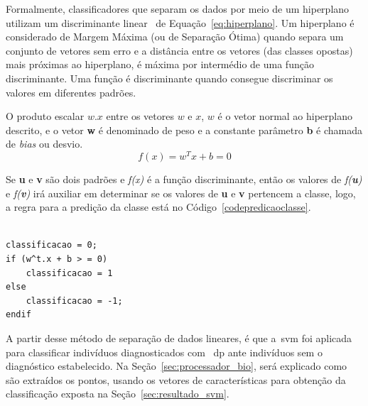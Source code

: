 Formalmente, classificadores que separam os dados por meio de um hiperplano utilizam um discriminante linear~\cite{valt2010} de Equação~\ref{eq:hiperplano}. Um hiperplano é considerado de Margem Máxima (ou de Separação Ótima) quando separa um conjunto de vetores sem erro e a distância entre os vetores (das classes opostas) mais próximas ao hiperplano, é máxima por intermédio de uma função discriminante. Uma função é discriminante quando consegue discriminar os valores em diferentes padrões. 

O produto escalar $ w.x $ entre os vetores $ w $ e $ x $, $ w $ é o vetor normal ao hiperplano descrito, e o vetor \textbf{w} é denominado de peso e a constante parâmetro \textbf{b} é chamada de \textit{bias} ou desvio.
\linebreak
\begin{equation}
f(x)=w^Tx+b=0
\label{eq:hiperplano}
\end{equation}

Se \textbf{u} e \textbf{v} são dois padrões e \textit{f(x)} é a função discriminante, então os valores de \textit{f(\textbf{u})} e \textit{f(\textbf{v})} irá auxiliar em determinar se os valores de \textbf{u} e \textbf{v} pertencem a classe, logo, a regra para a predição da classe está no Código~\ref{codepredicaoclasse}. 

\begin{lstlisting}[frame=single, caption=Código de Predição da Classes, label=codepredicaoclasse]  % Start your code-block

classificacao = 0;
if (w^t.x + b > = 0)
	classificacao = 1
else
	classificacao = -1;
endif
\end{lstlisting}
A partir desse método de separação de dados lineares, é que a~\ac{svm} foi aplicada para classificar indivíduos diagnosticados com ~\ac{dp} ante indivíduos sem o diagnóstico estabelecido. Na Seção~\ref{sec:processador_bio}, será explicado como são extraídos os pontos, usando os vetores de características para obtenção da classificação exposta na Seção~\ref{sec:resultado_svm}.

